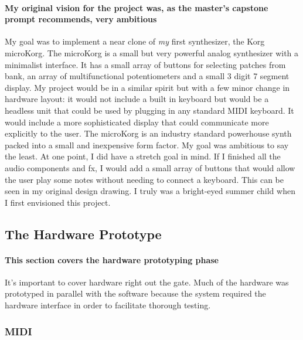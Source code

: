 \documentclass[acmlarge,screen]{acmart}
\begin{document}
	\paragraph{My original vision for the project was, as the master's capstone prompt recommends, very ambitious} My goal was to implement a near clone of \textit{my} first synthesizer, the Korg microKorg. The microKorg is a small but very powerful analog synthesizer with a minimalist interface. It has a small array of buttons for selecting patches from bank, an array of multifunctional potentiometers and a small 3 digit 7 segment display. My project would be in a similar spirit but with a few minor change in hardware layout: it would not include a built in keyboard but would be a headless unit that could be used by plugging in any standard MIDI keyboard. It would include a more sophisticated display that could communicate more explicitly to the user. The microKorg is an industry standard powerhouse synth packed into a small and inexpensive form factor. My goal was ambitious to say the least. \cite{ward_2003} At one point, I did have a stretch goal in mind. If I finished all the audio components and fx, I would add a small array of buttons that would allow the user play some notes without needing to connect a keyboard. This can be seen in my original design drawing. I truly was a bright-eyed summer child when I first envisioned this project.


\subsection{The Hardware Prototype}
	\paragraph{This section covers the hardware prototyping phase} It's important to cover hardware right out the gate. Much of the hardware was prototyped in parallel with the software because the system required the hardware interface in order to facilitate thorough testing.

	\subsubsection{MIDI}
\end{document}
